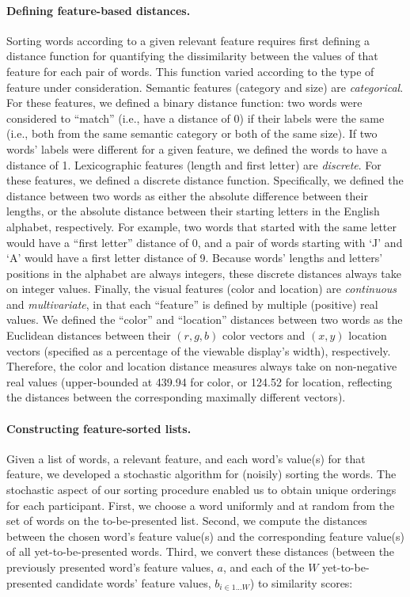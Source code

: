 \documentclass[11pt]{article}
\begin{document}
\paragraph{Defining feature-based distances.} Sorting words according to a
given relevant feature requires first defining a distance function for
quantifying the dissimilarity between the values of that feature for each pair
of words. This function varied according to the type of feature under
consideration. Semantic features (category and size) are \textit{categorical}.
For these features, we defined a binary distance function: two words were
considered to ``match'' (i.e., have a distance of 0) if their labels were the
same (i.e., both from the same semantic category or both of the same size). If
two words' labels were different for a given feature, we defined the words to
have a distance of 1. Lexicographic features (length and first letter) are
\textit{discrete}. For these features, we defined a discrete distance function.
Specifically, we defined the distance between two words as either the absolute
difference between their lengths, or the absolute distance between their
starting letters in the English alphabet, respectively. For example, two words
that started with the same letter would have a ``first letter'' distance of 0,
and a pair of words starting with `J' and `A' would have a first letter
distance of 9. Because words' lengths and letters' positions in the alphabet
are always integers, these discrete distances always take on integer values.
Finally, the visual features (color and location) are \textit{continuous} and
\textit{multivariate}, in that each ``feature'' is defined by multiple
(positive) real values. We defined the ``color'' and ``location'' distances
between two words as the Euclidean distances between their $(r, g, b)$ color
vectors and $(x, y)$ location vectors (specified as a percentage of the
viewable display's width), respectively. Therefore, the color and location
distance measures always take on non-negative real values (upper-bounded at
439.94 for color, or 124.52 for location, reflecting the distances between the
corresponding maximally different vectors).

\paragraph{Constructing feature-sorted lists.} Given a list of words, a
relevant feature, and each word's value(s) for that feature, we developed a
stochastic algorithm for (noisily) sorting the words. The stochastic aspect of
our sorting procedure enabled us to obtain unique orderings for each
participant. First, we choose a word uniformly and at random from the set of
words on the to-be-presented list. Second, we compute the distances between the
chosen word's feature value(s) and the corresponding feature value(s) of all
yet-to-be-presented words. Third, we convert these distances (between the
previously presented word's feature values, $a$, and each of the $W$
yet-to-be-presented candidate words' feature values, $b_{i \in 1...W}$) to
similarity scores:
\end{document}
